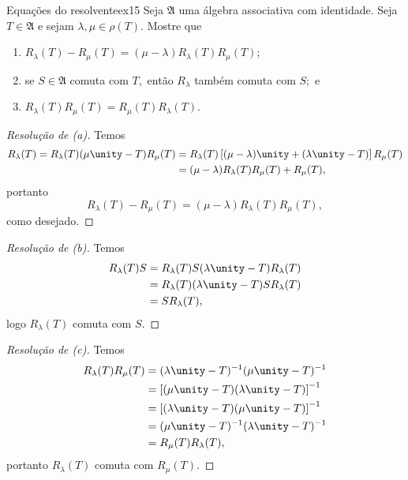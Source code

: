 \begin{exercício}{Equações do resolvente}{ex15}
  Seja \(\mathfrak{A}\) uma álgebra associativa com identidade. Seja \(T \in \mathfrak{A}\) e sejam \(\lambda, \mu \in \rho(T).\) Mostre que
    \begin{enumerate}[label=(\alph*)]
        \item \(R_\lambda(T) - R_\mu(T) = (\mu - \lambda) R_\lambda(T) R_\mu(T)\);
        \item se \(S \in \mathfrak{A}\) comuta com \(T,\) então \(R_\lambda\) também comuta com \(S;\) e
        \item \(R_\lambda(T)R_\mu(T) = R_\mu(T)R_\lambda(T)\).
    \end{enumerate}
\end{exercício}
\begin{proof}[Resolução de (a)]
  Temos
  \begin{align*}
    R_\lambda(T) = R_\lambda(T) (\mu \unity - T) R_\mu(T) &= R_\lambda(T) \left[(\mu - \lambda)\unity + (\lambda \unity - T)\right] R_\mu(T)\\
                                                          &= (\mu - \lambda)R_\lambda(T) R_\mu(T) + R_\mu(T),
  \end{align*}
  portanto
  \begin{equation*}
    R_\lambda(T) - R_\mu(T) = (\mu - \lambda)R_{\lambda}(T) R_\mu(T),
  \end{equation*}
  como desejado.
\end{proof}
\begin{proof}[Resolução de (b)]
  Temos
  \begin{align*}
    R_\lambda(T) S &= R_\lambda(T) S (\lambda \unity - T) R_\lambda(T)\\
                   &= R_\lambda(T) (\lambda\unity - T) S R_\lambda(T)\\
                   &= S R_{\lambda}(T),
  \end{align*}
  logo \(R_{\lambda}(T)\) comuta com \(S.\)
\end{proof}
\begin{proof}[Resolução de (c)]
  Temos
  \begin{align*}
    R_\lambda(T) R_\mu(T) &= (\lambda \unity - T)^{-1} (\mu\unity - T)^{-1}\\
                          &= \left[(\mu \unity - T) (\lambda \unity - T)\right]^{-1}\\
                          &= \left[(\lambda \unity - T)(\mu \unity - T)\right]^{-1}\\
                          &= (\mu \unity - T)^{-1} (\lambda \unity - T)^{-1}\\
                          &= R_\mu(T) R_\lambda(T),
  \end{align*}
  portanto \(R_\lambda(T)\) comuta com \(R_\mu(T).\)
\end{proof}
